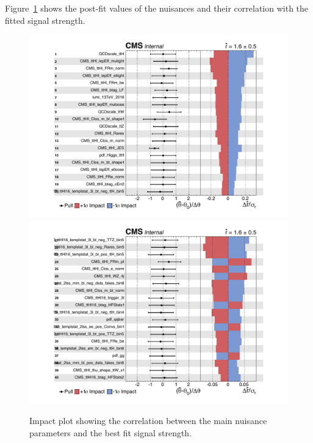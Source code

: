 Figure~\ref{fig:impacts} shows the post-fit values of the nuisances and their correlation with the fitted signal strength.

\begin{figure}[!htb]
\centering
\includegraphics[width=0.80\linewidth]{plots_postfit/impacts1.pdf}\\
\includegraphics[width=0.80\linewidth]{plots_postfit/impacts2.pdf}
\caption{Impact plot showing the correlation between the main nuisance parameters and the best fit signal strength.}
\label{fig:impacts}
\end{figure}
